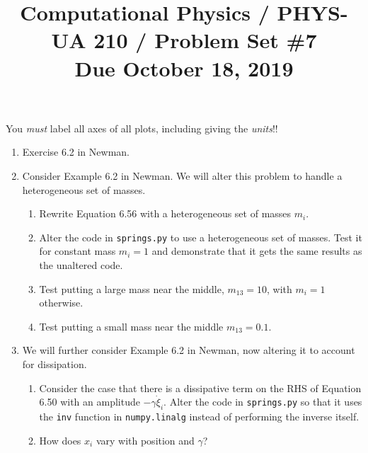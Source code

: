 \documentclass[11pt, preprint]{aastex}
\begin{document}
\title{\bf Computational Physics / PHYS-UA 210 / Problem Set \#7
\\ Due October 18, 2019 }

You {\it must} label all axes of all plots, including giving the {\it
  units}!!

\begin{enumerate}
\item Exercise 6.2 in Newman.
\item Consider Example 6.2 in Newman. We will alter this problem to
  handle a heterogeneous set of masses.
  \begin{enumerate}
    \item Rewrite Equation 6.56 with a heterogeneous set of masses
      $m_i$. 
    \item Alter the code in {\tt springs.py} to use a heterogeneous
      set of masses. Test it for constant mass $m_i = 1$ and
      demonstrate that it gets the same results as the unaltered code.
    \item Test putting a large mass near the middle, $m_{13} = 10$,
      with $m_i = 1$ otherwise. 
    \item Test putting a small mass near the middle $m_{13} = 0.1$.
  \end{enumerate}
\item We will further consider Example 6.2 in Newman, now altering it
  to account for dissipation. 
  \begin{enumerate}
    \item Consider the case that there is a dissipative term on the
      RHS of Equation 6.50 with an amplitude $-\gamma \dot\xi_i$.
      Alter the code in {\tt springs.py} so that it uses the {\tt inv}
      function in {\tt numpy.linalg} instead of performing the inverse
      itself.
    \item How does $x_i$ vary with position and $\gamma$?
  \end{enumerate}
\end{enumerate}
\end{document}
